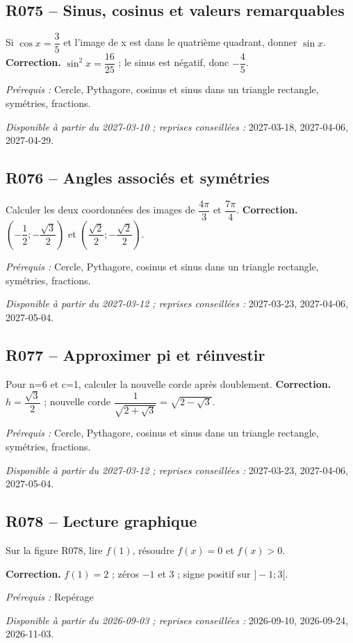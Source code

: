 \subsection*{R075 -- Sinus, cosinus et valeurs remarquables}\label{R075}
Si $\cos x=\dfrac{3}{5}$ et l’image de x est dans le quatrième quadrant, donner $\sin x$.
\ifprof\textbf{Correction.} $\sin ^2x=\dfrac{16}{25}$ ; le sinus est négatif, donc $-\dfrac{4}{5}$.\par\textit{Prérequis :} Cercle, Pythagore, cosinus et sinus dans un triangle rectangle, symétries, fractions.\par\textit{Disponible à partir du 2027-03-10 ; reprises conseillées :} 2027-03-18, 2027-04-06, 2027-04-29.\fi
{}\subsection*{R076 -- Angles associés et symétries}\label{R076}
Calculer les deux coordonnées des images de $\dfrac{4\pi}{3}$ et $\dfrac{7\pi}{4}$.
\ifprof\textbf{Correction.} $(-\dfrac{1}{2};-\dfrac{\sqrt 3}{2})$ et $(\dfrac{\sqrt 2}{2};-\dfrac{\sqrt 2}{2})$.\par\textit{Prérequis :} Cercle, Pythagore, cosinus et sinus dans un triangle rectangle, symétries, fractions.\par\textit{Disponible à partir du 2027-03-12 ; reprises conseillées :} 2027-03-23, 2027-04-06, 2027-05-04.\fi
{}\subsection*{R077 -- Approximer pi et réinvestir}\label{R077}
Pour n=6 et c=1, calculer la nouvelle corde après doublement.
\ifprof\textbf{Correction.} $h=\dfrac{\sqrt 3}{2}$ ; nouvelle corde $\dfrac{1}{\sqrt {2+\sqrt3}}=\sqrt {2-\sqrt3}$.\par\textit{Prérequis :} Cercle, Pythagore, cosinus et sinus dans un triangle rectangle, symétries, fractions.\par\textit{Disponible à partir du 2027-03-12 ; reprises conseillées :} 2027-03-23, 2027-04-06, 2027-05-04.\fi
{}
\subsection*{R078 -- Lecture graphique}\label{R078}
Sur la figure R078, lire $f(1)$, résoudre $f(x)=0$ et $f(x)>0$.
\begin{center}\end{center}\ifprof\textbf{Correction.} $f(1)=2$ ; zéros $-1$ et 3 ; signe positif sur $]-1;3[$.\par\textit{Prérequis :} Repérage\par\textit{Disponible à partir du 2026-09-03 ; reprises conseillées :} 2026-09-10, 2026-09-24, 2026-11-03.\fi
